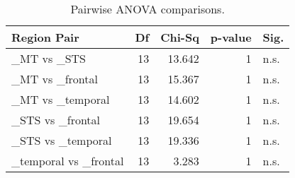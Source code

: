 \begin{table}[h]
\centering
\begin{tabular}{lrrrl}
\toprule
 Region Pair           &   Df &   Chi-Sq &   p-value & Sig.   \\
\midrule
 \_MT vs \_STS           &   13 &   13.642 &         1 & n.s.   \\
 \_MT vs \_frontal       &   13 &   15.367 &         1 & n.s.   \\
 \_MT vs \_temporal      &   13 &   14.602 &         1 & n.s.   \\
 \_STS vs \_frontal      &   13 &   19.654 &         1 & n.s.   \\
 \_STS vs \_temporal     &   13 &   19.336 &         1 & n.s.   \\
 \_temporal vs \_frontal &   13 &    3.283 &         1 & n.s.   \\
\bottomrule
\end{tabular}
\caption{Pairwise ANOVA comparisons.}
\end{table}